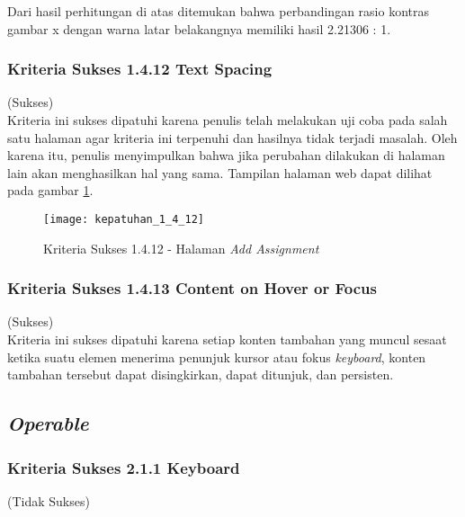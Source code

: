 Dari hasil perhitungan di atas ditemukan bahwa perbandingan rasio kontras gambar x dengan warna latar belakangnya memiliki hasil 2.21306 : 1.

\subsubsection{Kriteria Sukses 1.4.12 Text Spacing}
\label{subsubsec:kepatuhan_kriteria_1.4.12}
(Sukses) \\

Kriteria ini sukses dipatuhi karena penulis telah melakukan uji coba pada salah satu halaman agar kriteria ini terpenuhi dan hasilnya tidak terjadi masalah. Oleh karena itu, penulis menyimpulkan bahwa jika perubahan dilakukan di halaman lain akan menghasilkan hal yang sama. Tampilan halaman web dapat dilihat pada gambar \ref{fig:kepatuhan_1_4_12}.
\begin{figure}[H]
	\centering  
	\texttt{[image: kepatuhan\_1\_4\_12]}  
	\caption[Kriteria Sukses 1.4.12 - Halaman \textit{Add Assignment}]{Kriteria Sukses 1.4.12 - Halaman \textit{Add Assignment}} 
	\label{fig:kepatuhan_1_4_12} 
\end{figure}


\subsubsection{Kriteria Sukses 1.4.13 Content on Hover or Focus}
\label{subsubsec:kepatuhan_kriteria_1.4.13}
(Sukses) \\

Kriteria ini sukses dipatuhi karena setiap konten tambahan yang muncul sesaat ketika suatu elemen menerima penunjuk kursor atau fokus \textit{keyboard}, konten tambahan tersebut dapat disingkirkan, dapat ditunjuk, dan persisten.

\subsection{\textit{Operable}}
\label{subsec:kepatuhan_operable}

\subsubsection{Kriteria Sukses 2.1.1 Keyboard}
\label{subsubsec:kepatuhan_kriteria_2.1.1}
(Tidak Sukses) \\

